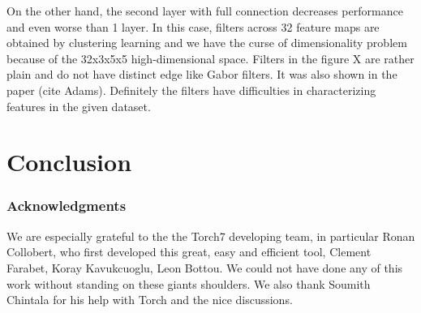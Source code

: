 \documentclass{article} %
\begin{document}
On the other hand, the second layer with full connection decreases performance and even worse than 1 layer. In this case, filters across 32 feature maps are obtained by clustering learning and we have the curse of dimensionality problem because of the 32x3x5x5 high-dimensional space. Filters in the figure X are rather plain and do not have distinct edge like Gabor filters. It was also shown in the paper (cite Adams). Definitely the filters have difficulties in characterizing features in the given dataset.

\section{Conclusion}
\label{sec-conc}



%


\subsubsection*{Acknowledgments}
We are especially grateful to the the Torch7 developing team, in particular Ronan Collobert, who first developed this great, easy and efficient tool, Clement Farabet, Koray Kavukcuoglu, Leon Bottou. We could not have done any of this work without standing on these giants shoulders. We also thank Soumith Chintala for his help with Torch and the nice discussions.



\end{document}
